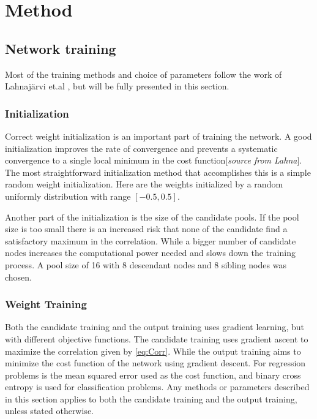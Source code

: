 \documentclass[a4paper,11pt, usenatbib]{article}
\begin{document}
\section{Method}
\setcounter{equation}{0}
\label{sec:Method}
\subsection{Network training}
\label{ssec:Network Training}
Most of the training methods and choice of parameters follow the work of Lahnajärvi et.al \cite{lahnajarvi_evaluation_2002}, but will be fully presented in this section.
\subsubsection{Initialization}
\label{sssec:Initialization}
Correct weight initialization is an important part of training the network. A good initialization improves the rate of convergence and prevents a systematic convergence to a single local minimum in the cost function[\textit{source from Lahna}]. The most straightforward initialization method that accomplishes this is a simple random weight initialization. Here are the weights initialized by a random uniformly distribution with range $[-0.5, 0.5]$. 

Another part of the initialization is the size of the candidate pools. If the pool size is too small there is an increased risk that none of the candidate find a satisfactory maximum in the correlation. While a bigger number of candidate nodes increases the computational power needed and slows down the training process. A pool size of 16 with 8 descendant nodes and 8 sibling nodes was chosen. %
\subsubsection{Weight Training}
\label{sssec:Weight Training}
Both the candidate training and the output training uses gradient learning, but with different objective functions. The candidate training uses gradient ascent to maximize the correlation given by \eqref{eq:Corr}. While the output training aims to minimize the cost function of the network using gradient descent. For regression problems is the mean squared error used as the cost function, and binary cross entropy is used for classification problems. Any methods or parameters described in this section applies to both the candidate training and the output training, unless stated otherwise. 
\end{document}
